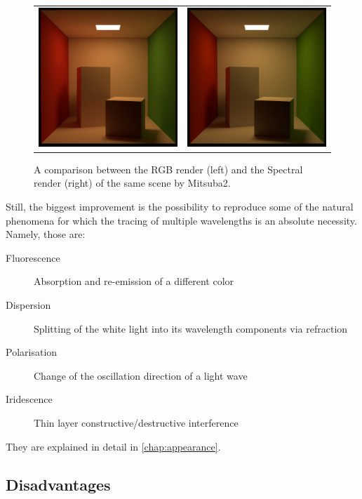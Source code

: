 \begin{figure}[httpb]
	\begin{tabular}{cc}
		\includegraphics[width=.45\linewidth]{img/rgb.jpg}
		&
		\includegraphics[width=.45\linewidth]{img/spectral.jpg}
	\end{tabular}
	\caption{A comparison between the RGB render (left) and the Spectral render (right) of the same scene by Mitsuba2.}
	\label{fig:compare_color}
\end{figure}

Still, the biggest improvement is the possibility to reproduce some of the natural phenomena for which the tracing of multiple wavelengths is an absolute necessity. Namely, those are:
\begin{description}
	\item[Fluorescence] Absorption and re-emission of a different color
	\item[Dispersion] Splitting of the white light into its wavelength components via refraction
	\item[Polarisation] Change of the oscillation direction of a light wave 
	\item[Iridescence] Thin layer constructive/destructive interference
\end{description}
They are explained in detail in \autoref{chap:appearance}.

\subsection{Disadvantages}

